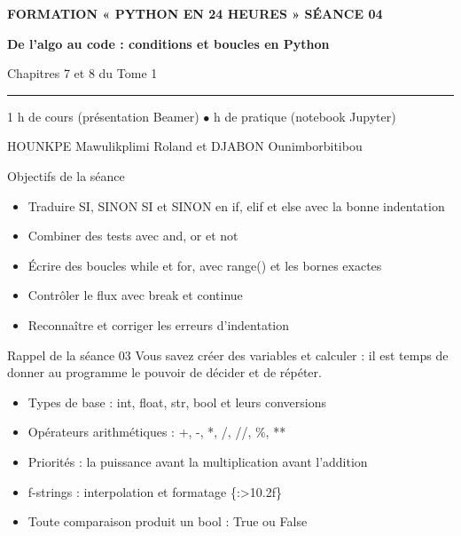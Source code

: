 \documentclass[aspectratio=169,11pt]{beamer}
\begin{document}
{%
\begin{frame}[plain]
\vspace{10mm}
{\color{PyJaune}\small\bfseries FORMATION « PYTHON EN 24 HEURES » \quad\textbar\quad SÉANCE 04\par}
\vspace{4mm}
{\color{white}\Huge\bfseries De l'algo au code : conditions et boucles en Python\par}
\vspace{4mm}
{\color{PyBleuClair}\large Chapitres 7 et 8 du Tome 1\par}
\vspace{7mm}
{\color{PyJaune}\rule{34mm}{2.2pt}\par}
\vspace{7mm}
{\color{white}\normalsize 1 h de cours (présentation Beamer) \quad$\bullet$ h de pratique (notebook Jupyter)\par}
\vspace{2.5mm}
{\color{PyBleuClair}\normalsize HOUNKPE Mawulikplimi Roland et DJABON Ounimborbitibou\par}
\end{frame}
}
\begin{frame}{Objectifs de la séance}
\begin{itemize}
  \item Traduire SI, SINON SI et SINON en if, elif et else avec la bonne indentation
  \item Combiner des tests avec and, or et not
  \item Écrire des boucles while et for, avec range() et les bornes exactes
  \item Contrôler le flux avec break et continue
  \item Reconnaître et corriger les erreurs d'indentation
\end{itemize}
\end{frame}
\begin{frame}{Rappel de la séance 03}
Vous savez créer des variables et calculer : il est temps de donner au programme le pouvoir de décider et de répéter.

\begin{itemize}
  \item Types de base : int, float, str, bool et leurs conversions
  \item Opérateurs arithmétiques : +, -, *, /, //, \%, **
  \item Priorités : la puissance avant la multiplication avant l'addition
  \item f-strings : interpolation et formatage \{:>10.2f\}
  \item Toute comparaison produit un bool : True ou False
\end{itemize}
\end{frame}
\end{document}
